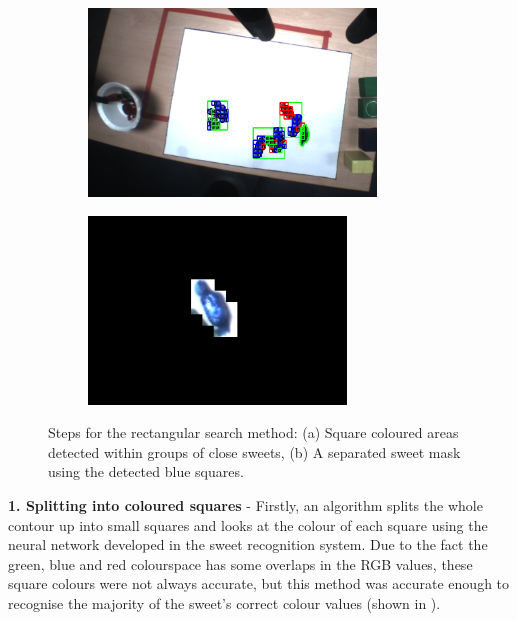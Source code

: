\begin{figure}[H]
    \captionsetup[subfigure]{justification=centering}
    \begin{subfigure}[H]{0.475\textwidth}   
        \centering 
        \caption{}
        \includegraphics[width=\textwidth, height=5cm]{boxapproach.png}
        \label{fig:boxapproach}
    \end{subfigure}
    \begin{subfigure}[H]{0.475\textwidth}   
        \centering
        \caption{}
        \includegraphics[width=\textwidth, height=5cm]{separatecollisionintoarea.png}
        \label{fig:maskedsweet}
    \end{subfigure}
    \vspace{-0.5cm}
    \caption{Steps for the rectangular search method: (a) Square coloured areas detected within groups of close sweets, (b) A separated sweet mask using the detected blue squares.}
\end{figure}
\textbf{1. Splitting into coloured squares} - Firstly, an algorithm splits the whole contour up into small squares and looks at the colour of each square using the neural network developed in the sweet recognition system. Due to the fact the green, blue and red colourspace has some overlaps in the RGB values, these square colours were not always accurate, but this method was accurate enough to recognise the majority of the sweet's correct colour values (shown in \textbf{}).
\newline\newline
